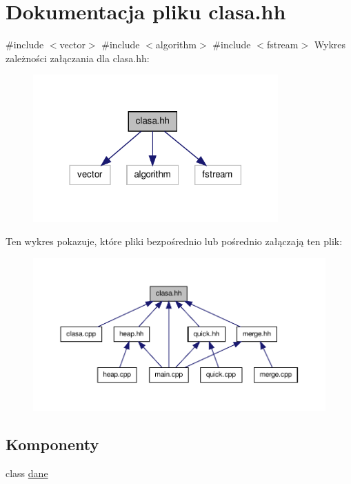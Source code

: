 \hypertarget{clasa_8hh}{\section{\-Dokumentacja pliku clasa.\-hh}
\label{clasa_8hh}
}
{\ttfamily \#include $<$vector$>$}\*
{\ttfamily \#include $<$algorithm$>$}\*
{\ttfamily \#include $<$fstream$>$}\*
\-Wykres zależności załączania dla clasa.\-hh\-:\nopagebreak
\begin{figure}[H]
\begin{center}
\leavevmode
\includegraphics[width=266pt]{clasa_8hh__incl}
\end{center}
\end{figure}
\-Ten wykres pokazuje, które pliki bezpośrednio lub pośrednio załączają ten plik\-:\nopagebreak
\begin{figure}[H]
\begin{center}
\leavevmode
\includegraphics[width=350pt]{clasa_8hh__dep__incl}
\end{center}
\end{figure}
\subsection*{\-Komponenty}
\begin{DoxyCompactItemize}
\item 
class \hyperlink{classdane}{dane}
\end{DoxyCompactItemize}
